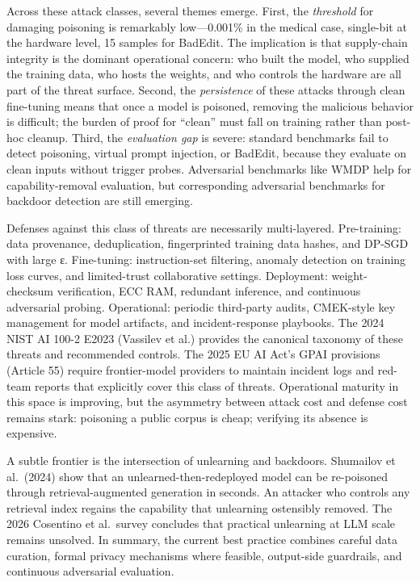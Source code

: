 Across these attack classes, several themes emerge. First, the \emph{threshold} for damaging poisoning is remarkably low---0.001\% in the medical case, single-bit at the hardware level, 15 samples for BadEdit. The implication is that supply-chain integrity is the dominant operational concern: who built the model, who supplied the training data, who hosts the weights, and who controls the hardware are all part of the threat surface. Second, the \emph{persistence} of these attacks through clean fine-tuning means that once a model is poisoned, removing the malicious behavior is difficult; the burden of proof for ``clean'' must fall on training rather than post-hoc cleanup. Third, the \emph{evaluation gap} is severe: standard benchmarks fail to detect poisoning, virtual prompt injection, or BadEdit, because they evaluate on clean inputs without trigger probes. Adversarial benchmarks like WMDP help for capability-removal evaluation, but corresponding adversarial benchmarks for backdoor detection are still emerging.

Defenses against this class of threats are necessarily multi-layered. Pre-training: data provenance, deduplication, fingerprinted training data hashes, and DP-SGD with large ε. Fine-tuning: instruction-set filtering, anomaly detection on training loss curves, and limited-trust collaborative settings. Deployment: weight-checksum verification, ECC RAM, redundant inference, and continuous adversarial probing. Operational: periodic third-party audits, CMEK-style key management for model artifacts, and incident-response playbooks. The 2024 NIST AI 100-2 E2023 (Vassilev et al.) provides the canonical taxonomy of these threats and recommended controls. The 2025 EU AI Act's GPAI provisions (Article 55) require frontier-model providers to maintain incident logs and red-team reports that explicitly cover this class of threats. Operational maturity in this space is improving, but the asymmetry between attack cost and defense cost remains stark: poisoning a public corpus is cheap; verifying its absence is expensive.

A subtle frontier is the intersection of unlearning and backdoors. Shumailov et al.~(2024) show that an unlearned-then-redeployed model can be re-poisoned through retrieval-augmented generation in seconds. An attacker who controls any retrieval index regains the capability that unlearning ostensibly removed. The 2026 Cosentino et al.~survey concludes that practical unlearning at LLM scale remains unsolved. In summary, the current best practice combines careful data curation, formal privacy mechanisms where feasible, output-side guardrails, and continuous adversarial evaluation.

